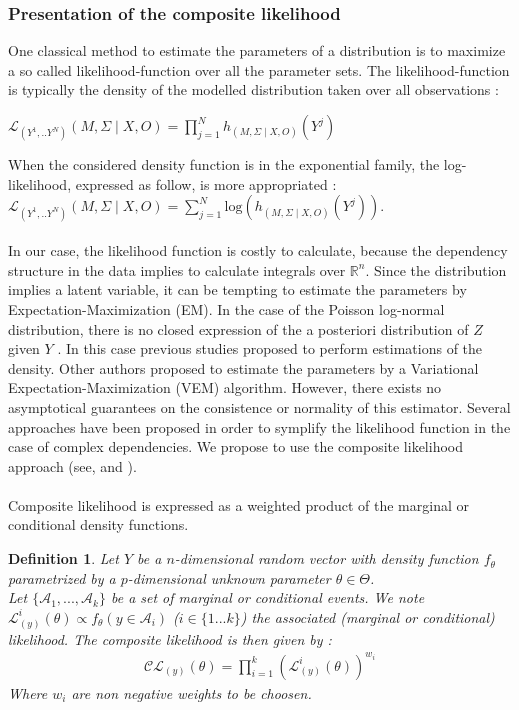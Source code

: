 \documentclass[11pt, a4paper]{article}
\newtheorem{definition}{Definition}
\begin{document}
\subsubsection{Presentation of the composite likelihood}
One classical method to estimate the parameters of a distribution is to maximize a so called likelihood-function over all the parameter sets. The likelihood-function is typically the density of the modelled distribution taken over all observations :
\begin{center}
$\mathcal{L}_{(Y^1,..Y^N)}(M,\Sigma \mid X,O) = \prod_{j=1}^N h_{(M,\Sigma \mid X,O)}(Y^j)$
\end{center}
When the considered density function is in the exponential family, the log-likelihood, expressed as follow, is more appropriated : 
$\mathcal{L}_{(Y^1,..Y^N)}(M,\Sigma \mid X,O) = \sum_{j=1}^N \mathrm{log} (h_{(M,\Sigma \mid X,O)}(Y^j))$.\\
\\ 
In our case, the likelihood function is costly to calculate, because the dependency structure in the data implies to calculate integrals over $\mathbb{R}^n$. Since the distribution implies a latent variable, it can be tempting to estimate the parameters by Expectation-Maximization (EM). In the case of the Poisson log-normal distribution, there is no closed expression of the a posteriori distribution of $Z$ given $Y$ \cite{Karlis2005}. In this case previous studies proposed to perform estimations of the density. Other authors \cite{chiquet2017variational} proposed to estimate the parameters by a Variational Expectation-Maximization (VEM) algorithm. However, there exists no  asymptotical guarantees on the consistence or normality of this estimator.
Several approaches have been proposed in order to symplify the likelihood function in the case of complex dependencies. We propose to use the composite likelihood approach (see\cite{varin2011overview}, \cite{pedeli2018pairwise} and \cite{varin2008composite}).\\
\\
Composite likelihood is expressed as a weighted product of the marginal or conditional density functions.
\begin{definition}\cite{varin2011overview} Let $Y$ be a $n$-dimensional random vector with density function $f_\theta$ parametrized by a $p$-dimensional unknown parameter $\theta \in \Theta$.\\
Let $\{\mathcal{A}_1,..., \mathcal{A}_k\}$ be a set of marginal or conditional events. We note $\mathcal{L}^i_{(y)} (\theta) \varpropto f_\theta(y \in \mathcal{A}_i)$ ($i \in \{1...k\}$) the associated (marginal or conditional) likelihood. The composite likelihood is then given by :
\begin{align*}
\mathcal{CL}_{(y)}(\theta) = \prod_{i=1}^k (\mathcal{L}^i_{(y)}(\theta))^{w_i} 
\end{align*}
Where $w_i$ are non negative weights to be choosen.
\end{definition}
\end{document}
